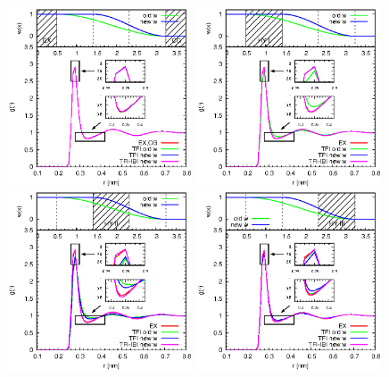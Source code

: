 \documentclass[aps,pre,preprint,unsortedaddress]{revtex4}
\begin{document}
\begin{figure}
  \centering
  \includegraphics[width=0.49\textwidth]{fig/rdf-ex-cg.eps}
  \includegraphics[width=0.49\textwidth]{fig/rdf-425-516.eps}
  \includegraphics[width=0.49\textwidth]{fig/rdf-516-608.eps}
  \includegraphics[width=0.49\textwidth]{fig/rdf-608-700.eps}

\end{figure}
\end{document}
